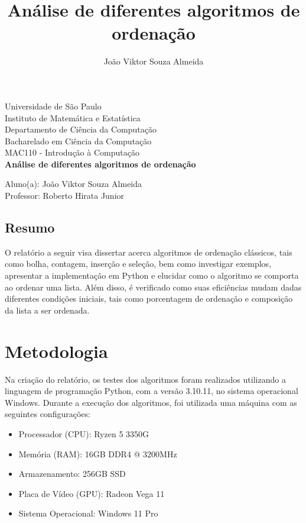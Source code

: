 \documentclass[10pt,a4paper]{article}
\author{João Viktor Souza Almeida}
\title{Análise de diferentes algoritmos de ordenação}
\begin{document}
\begin{titlepage} %
    \begin{center} %
    {\large Universidade de São Paulo}\\[0.2cm] %
    {\large Instituto de Matemática e Estatística}\\[0.2cm] %
    {\large Departamento de Ciência da Computação}\\[0.2cm]
    {\large Bacharelado em Ciência da Computação}\\[0.2cm]
    {\large MAC110 - Introdução à Computação}\\[5.1cm]
    {\bf \huge Análise de diferentes algoritmos de ordenação}\\[5.1cm] 
    \end{center} %
    {\large Aluno(a): João Viktor Souza Almeida}\\[0.7cm] %
    {\large Professor: Roberto Hirata Junior}\\[5.1cm]
    \end{titlepage} %

\subsection*{Resumo}
O relatório a seguir visa dissertar acerca algoritmos de ordenação clássicos, tais como bolha, contagem, inserção e seleção, bem como investigar exemplos, apresentar a implementação em Python e elucidar como o algoritmo se comporta ao ordenar uma lista.
Além disso, é verificado como suas eficiências mudam dadas diferentes condições iniciais, tais como porcentagem de ordenação e composição da lista a ser ordenada. 
\
\section*{Metodologia}
Na criação do relatório, os testes dos algoritmos foram realizados utilizando a linguagem de programação Python, com a versão 3.10.11, no sistema operacional Windows. Durante a execução dos algoritmos, foi utilizada uma máquina com as seguintes configurações:
\begin{itemize}
\item    Processador (CPU): Ryzen 5 3350G 
\item Memória (RAM): 16GB DDR4 @ 3200MHz
\item Armazenamento: 256GB SSD
\item Placa de Vídeo (GPU): Radeon Vega 11
\item Sistema Operacional: Windows 11 Pro
\end{itemize}
\end{document}
